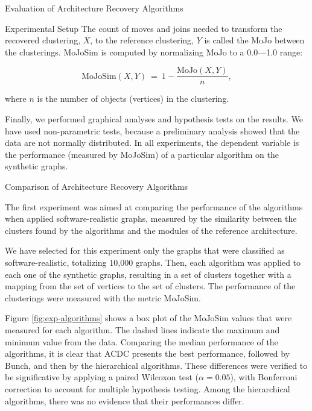 \documentclass[11pt,twocolumn,a4paper,english]{article}
\begin{document}
\begin{section}{Evaluation of Architecture Recovery Algorithms}
\begin{subsection}{Experimental Setup}
	The count of moves and joins needed to transform the recovered clustering, $X$, to the reference clustering, $Y$ is called the MoJo between the clusterings. MoJoSim is computed by normalizing MoJo to a 0.0---1.0 range:
	
	$$
	\mathrm{MoJoSim}(X, Y) ~=~ 1 - \frac{\mathrm{MoJo}(X, Y)}{n}\mathrm{,}
	$$
	
	where $n$ is the number of objects (vertices) in the clustering.
	
	Finally, we performed graphical analyses and hypothesis tests on the results. We have used non-parametric tests, because a preliminary analysis showed that the data are not normally distributed. In all experiments, the dependent variable is the performance (measured by MoJoSim) of a particular algorithm on the synthetic graphs.
	
\end{subsection}

\begin{subsection}{Comparison of Architecture Recovery Algorithms} \label{sec:exp1}
	
	The first experiment was aimed at comparing the performance of the algorithms when applied software-realistic graphs, measured by the similarity between the clusters found by the algorithms and the modules of the reference architecture.
	
	We have selected for this experiment only the graphs that were classified as software-realistic, totalizing 10,000 graphs. Then, each algorithm was applied to each one of the synthetic graphs, resulting in a set of clusters together with a mapping from the set of vertices to the set of clusters. The performance of the clusterings were measured with the metric MoJoSim.
	
	Figure \ref{fig:exp-algorithms} shows a box plot of the MoJoSim values that were measured for each algorithm. The dashed lines indicate the maximum and minimum value from the data. Comparing the median performance of the algorithms, it is clear that ACDC presents the best performance, followed by Bunch, and then by the hierarchical algorithms. These differences were verified to be significative by applying a paired Wilcoxon test ($\alpha = 0.05$), with Bonferroni correction to account for multiple hypothesis testing. Among the hierarchical algorithms, there was no evidence that their performances differ.
	

\end{subsection}
\end{section}
\end{document}
